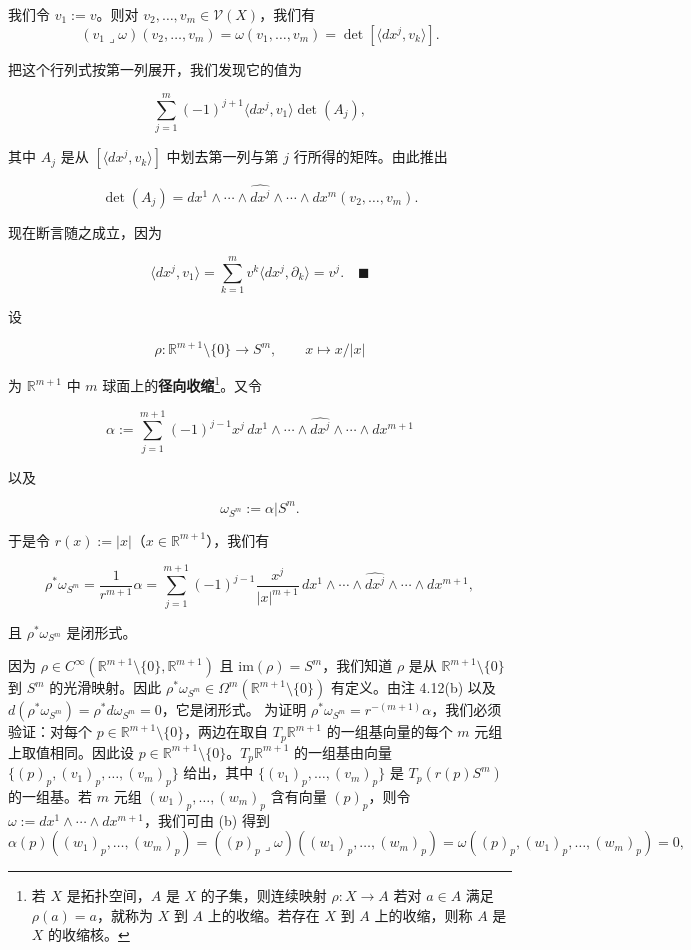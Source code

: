 \begin{examplenote}
\begin{items}
\proofhead
我们令 $ v_{1} := v $。则对 $ v_{2}, \ldots, v_{m}\in\mathcal{V}(X) $，我们有
\[
(v_{1}\lrcorner\omega)(v_{2}, \ldots, v_{m}) = \omega(v_{1}, \ldots, v_{m}) = \det\left[\langle dx^{j}, v_{k}\rangle\right] .
\]

把这个行列式按第一列展开，我们发现它的值为

\[
\sum_{j=1}^{m}(-1)^{j+1}\langle dx^{j}, v_{1}\rangle\det(A_{j}) ,
\]

其中 $ A_{j} $ 是从 $ [\langle dx^{j}, v_{k}\rangle] $ 中划去第一列与第 $ j $ 行所得的矩阵。由此推出

\[
\det(A_{j}) = dx^{1}\wedge\cdots\wedge\widehat{dx^{j}}\wedge\cdots\wedge dx^{m}(v_{2}, \ldots, v_{m}) .
\]

现在断言随之成立，因为

\[
\langle dx^{j}, v_{1}\rangle = \sum_{k=1}^{m} v^{k}\langle dx^{j}, \partial_{k}\rangle = v^{j} .\quad\blacksquare
\]
\item

设

\[
\rho: \mathbb{R}^{m+1}\setminus\{0\} \to S^{m}, \qquad x\mapsto x/|x|
\]

为 $ \mathbb{R}^{m+1} $ 中 $ m $ 球面上的\textbf{径向收缩}\footnote{若 $ X $ 是拓扑空间，$ A $ 是 $ X $ 的子集，则连续映射 $ \rho: X\to A $ 若对 $ a\in A $ 满足 $ \rho(a) = a $，就称为 $ X $ 到 $ A $ 上的收缩。若存在 $ X $ 到 $ A $ 上的收缩，则称 $ A $ 是 $ X $ 的收缩核。}。又令

\[
\alpha := \sum_{j=1}^{m+1}(-1)^{j-1}x^{j}\,dx^{1}\wedge\cdots\wedge\widehat{dx^{j}}\wedge\cdots\wedge dx^{m+1}
\]

以及

\[
\omega_{S^{m}} := \alpha|S^{m} .
\]

于是令 $ r(x) := |x| $（$ x\in\mathbb{R}^{m+1} $），我们有

\[
\rho^{\ast}\omega_{S^{m}} = \frac{1}{r^{m+1}}\alpha = \sum_{j=1}^{m+1}(-1)^{j-1}\frac{x^{j}}{|x|^{m+1}}\,dx^{1}\wedge\cdots\wedge\widehat{dx^{j}}\wedge\cdots\wedge dx^{m+1} ,
\]

且 $ \rho^{\ast}\omega_{S^{m}} $ 是闭形式。

\proofhead
因为 $ \rho\in C^{\infty}(\mathbb{R}^{m+1}\setminus\{0\}, \mathbb{R}^{m+1}) $ 且 $ \mathrm{im}(\rho) = S^{m} $，我们知道 $ \rho $ 是从 $ \mathbb{R}^{m+1}\setminus\{0\} $ 到 $ S^{m} $ 的光滑映射。因此 $ \rho^{\ast}\omega_{S^{m}}\in\Omega^{m}(\mathbb{R}^{m+1}\setminus\{0\}) $ 有定义。由注 4.12(b) 以及 $ d(\rho^{\ast}\omega_{S^{m}}) = \rho^{\ast}d\omega_{S^{m}} = 0 $，它是闭形式。
为证明 $ \rho^{\ast}\omega_{S^{m}} = r^{-(m+1)}\alpha $，我们必须验证：对每个 $ p\in\mathbb{R}^{m+1}\setminus\{0\} $，两边在取自 $ T_{p}\mathbb{R}^{m+1} $ 的一组基向量的每个 $ m $ 元组上取值相同。因此设 $ p\in\mathbb{R}^{m+1}\setminus\{0\} $。$ T_{p}\mathbb{R}^{m+1} $ 的一组基由向量 $ \{(p)_{p}, (v_{1})_{p}, \ldots, (v_{m})_{p}\} $ 给出，其中
$ \{ (v_1)_p, \ldots, (v_m)_p \} $ 是 $ T_{p}(r(p)S^{m}) $ 的一组基。若 $ m $ 元组 $ (w_1)_p, \ldots, (w_m)_p $ 含有向量 $ (p)_p $，则令 $ \omega := dx^{1} \wedge \cdots \wedge dx^{m+1} $，我们可由 (b) 得到
\[
\alpha(p)((w_1)_p,\ldots,(w_m)_p) = ((p)_p \lrcorner \omega)((w_1)_p,\ldots,(w_m)_p) = \omega((p)_p,(w_1)_p,\ldots,(w_m)_p) = 0 ,
\]


\end{items}
\end{examplenote}
